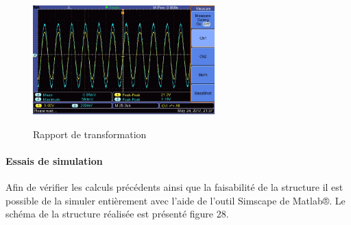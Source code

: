 \documentclass[12pt]{article}
\begin{document}
\begin{figure}[!h]
  \hspace{-30pt}
  \vspace{-30pt}
  \begin{minipage}[b]{0.45\linewidth}
   \centering
   \includegraphics[width=7cm,height=5cm,trim=0cm 0cm 0cm 0cm, clip=true]{Images_rapport/Transfo2}  
   \caption{Rapport de transformation}   
  \end{minipage}
\hfill
\end{figure}
\vspace{40pt}






















\newpage
\paragraph{Essais de simulation}

Afin de vérifier les calculs précédents ainsi que la faisabilité de la structure il est possible de la simuler entièrement avec l'aide de l'outil Simscape de Matlab®. Le schéma de la structure réalisée est présenté figure 28.
\end{document}

